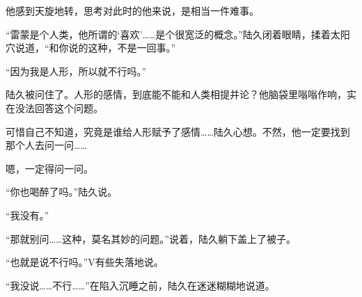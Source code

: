 他感到天旋地转，思考对此时的他来说，是相当一件难事。

“雷蒙是个人类，他所谓的‘喜欢’……是个很宽泛的概念。”陆久闭着眼睛，揉着太阳穴说道，“和你说的这种，不是一回事。”

“因为我是人形，所以就不行吗。”

陆久被问住了。人形的感情，到底能不能和人类相提并论？他脑袋里嗡嗡作响，实在没法回答这个问题。

可惜自己不知道，究竟是谁给人形赋予了感情……陆久心想。不然，他一定要找到那个人去问一问……

嗯，一定得问一问。

“你也喝醉了吗。”陆久说。

“我没有。”

“那就别问……这种，莫名其妙的问题。”说着，陆久躺下盖上了被子。

“也就是说不行吗。”V有些失落地说。

“我没说……不行……”在陷入沉睡之前，陆久在迷迷糊糊地说道。